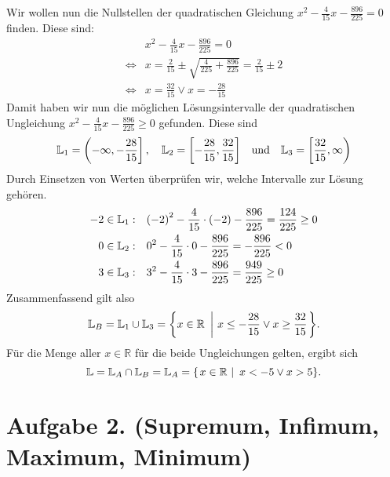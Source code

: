 \documentclass[german,12pt]{homework}
\newcommand{\RR}{\mathbb{R}}
\newcommand{\LL}{\mathbb{L}}
\DeclarePairedDelimiter{\enbrace}{(}{)}
\DeclarePairedDelimiter{\benbrace}{[}{]}
\DeclarePairedDelimiter{\penbrace}{\{}{\}}
\begin{document}
\begin{enumerate}
        Wir wollen nun die Nullstellen der quadratischen Gleichung \(x^2 - \frac{4}{15}x - \frac{896}{225} = 0\) finden. Diese sind:
        \begin{align*}
            &x^2 - \frac{4}{15}x - \frac{896}{225} = 0\\
            \iff&x = \frac{2}{15} \pm \sqrt{\frac{4}{225} + \frac{896}{225}} = \frac{2}{15} \pm 2\\
            \iff&x = \frac{32}{15} \lor x = -\frac{28}{15}
        \end{align*}
        Damit haben wir nun die möglichen Lösungsintervalle der quadratischen Ungleichung \(x^2 - \frac{4}{15}x - \frac{896}{225} \ge 0\) gefunden. Diese sind
        \[\LL_1 = \left(-\infty, -\frac{28}{15}\right], \quad \LL_2 = \benbrace*{-\frac{28}{15}, \frac{32}{15}} \quad \text{und} \quad \LL_3 = \left[\frac{32}{15}, \infty\right)\]
        Durch Einsetzen von Werten überprüfen wir, welche Intervalle zur Lösung gehören.
        \begin{align*}
            -2 \in \LL_1: \quad &\enbrace*{-2}^2 - \frac{4}{15} \cdot \enbrace*{-2} - \frac{896}{225} = \frac{124}{225} \ge 0\\
            0 \in \LL_2: \quad &0^2 - \frac{4}{15} \cdot 0 - \frac{896}{225} = -\frac{896}{225} < 0\\
            3 \in \LL_3: \quad &3^2 - \frac{4}{15} \cdot 3 - \frac{896}{225} = \frac{949}{225} \ge 0
        \end{align*}
        Zusammenfassend gilt also
        \[\LL_B = \LL_1 \cup \LL_3 = \penbrace*{x \in \RR\ \left|\ x \le -\frac{28}{15} \lor x \ge \frac{32}{15}\right.}.\]
        Für die Menge aller \(x \in \RR\) für die beide Ungleichungen gelten, ergibt sich
        \[\LL = \LL_A \cap \LL_B = \LL_A = \penbrace*{\left.x \in \RR\ \right|\ x < -5 \lor x > 5}.\]
    \end{enumerate}

    \section*{Aufgabe 2. (Supremum, Infimum, Maximum, Minimum)}
\end{document}
